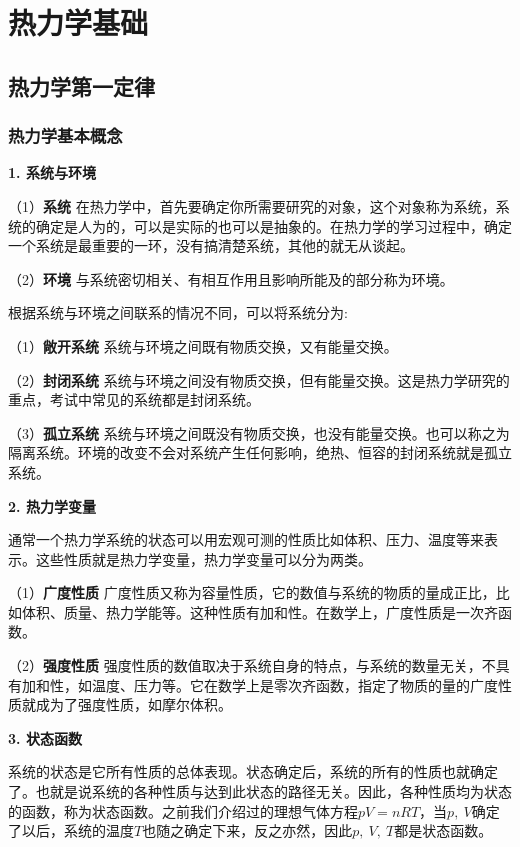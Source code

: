 \documentclass[lang=cn,newtx,10pt,scheme=chinese]{elegantbook}
\begin{document}
\chapter{热力学基础}
\section{热力学第一定律}
\subsection{热力学基本概念}
\textbf{1. 系统与环境}

（1）\textbf{系统} \quad 在热力学中，首先要确定你所需要研究的对象，这个对象称为系统，系统的确定是人为的，可以是实际的也可以是抽象的。在热力学的学习过程中，确定一个系统是最重要的一环，没有搞清楚系统，其他的就无从谈起。

（2）\textbf{环境} \quad 与系统密切相关、有相互作用且影响所能及的部分称为环境。

根据系统与环境之间联系的情况不同，可以将系统分为:

（1）\textbf{敞开系统} \quad 系统与环境之间既有物质交换，又有能量交换。

（2）\textbf{封闭系统} \quad 系统与环境之间没有物质交换，但有能量交换。这是热力学研究的重点，考试中常见的系统都是封闭系统。

（3）\textbf{孤立系统} \quad 系统与环境之间既没有物质交换，也没有能量交换。也可以称之为隔离系统。环境的改变不会对系统产生任何影响，绝热、恒容的封闭系统就是孤立系统。

\textbf{2. 热力学变量}

通常一个热力学系统的状态可以用宏观可测的性质比如体积、压力、温度等来表示。这些性质就是热力学变量，热力学变量可以分为两类。

（1）\textbf{广度性质} \quad 广度性质又称为容量性质，它的数值与系统的物质的量成正比，比如体积、质量、热力学能等。这种性质有加和性。在数学上，广度性质是一次齐函数。

（2）\textbf{强度性质} \quad 强度性质的数值取决于系统自身的特点，与系统的数量无关，不具有加和性，如温度、压力等。它在数学上是零次齐函数，指定了物质的量的广度性质就成为了强度性质，如摩尔体积。

\textbf{3. 状态函数}

系统的状态是它所有性质的总体表现。状态确定后，系统的所有的性质也就确定了。也就是说系统的各种性质与达到此状态的路径无关。因此，各种性质均为状态的函数，称为状态函数。之前我们介绍过的理想气体方程$pV=nRT$，当$p, \ V$确定了以后，系统的温度$T$也随之确定下来，反之亦然，因此$p, \ V, \ T$都是状态函数。
\end{document}

